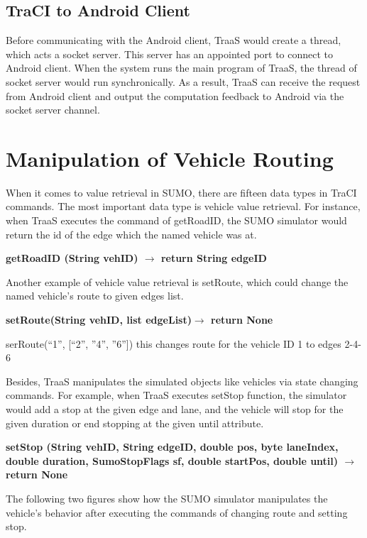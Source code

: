 \documentclass[12pt]{ksthesis}
\begin{document}
\begin{thesis}
{\subsection{TraCI to Android Client}
Before communicating with the Android client, TraaS would create a thread, which acts a socket server. This server has an appointed port to connect to Android client. When the system runs the main program of TraaS, the thread of socket server would run synchronically. As a result, TraaS can receive the request from Android client and output the computation feedback to Android via the socket server channel.

\section{Manipulation of Vehicle Routing}
When it comes to value retrieval in SUMO, there are fifteen data types in TraCI commands. The most important data type is vehicle value retrieval. For instance, when TraaS executes the command of getRoadID, the SUMO simulator would return the id of the edge which the named vehicle was at.

\textbf{getRoadID (String vehID) $\rightarrow$ return String edgeID}


Another example of vehicle value retrieval is setRoute, which could change the named vehicle’s route to given edges list.

\textbf{setRoute(String vehID, list edgeList)$\rightarrow$ return None}

serRoute(“1”, [“2”, ”4”, ”6”]) this changes route for the vehicle ID 1 to edges 2-4-6

Besides, TraaS manipulates the simulated objects like vehicles via state changing commands. For example, when TraaS executes setStop function, the simulator would add a stop at the given edge and lane, and the vehicle will stop for the given duration or end stopping at the given until attribute.
 
\textbf{setStop (String vehID, String edgeID, double pos, byte laneIndex, double duration, SumoStopFlags sf, double startPos, double until) $\rightarrow$ return None}
 
The following two figures show how the SUMO simulator manipulates the vehicle’s behavior after executing the commands of changing route and setting stop.


}
\end{thesis}
\end{document}
